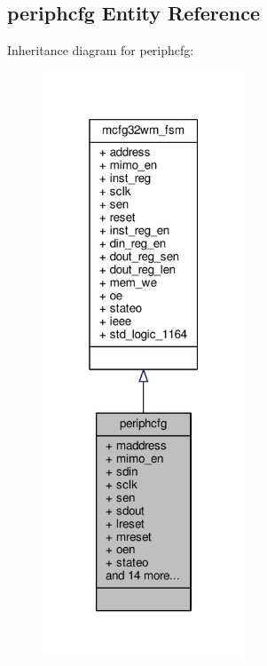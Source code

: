 \subsection{periphcfg Entity Reference}
\label{classperiphcfg}


Inheritance diagram for periphcfg\+:\nopagebreak
\begin{figure}[H]
\begin{center}
\leavevmode
\includegraphics[width=171pt]{d7/d81/classperiphcfg__inherit__graph}
\end{center}
\end{figure}


